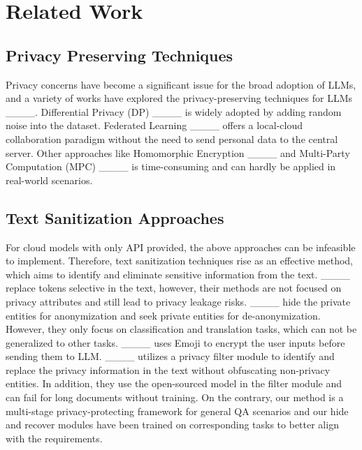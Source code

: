 \section{Related Work}
\label{sec:related work}
\subsection{Privacy Preserving Techniques}
Privacy concerns have become a significant issue for the broad adoption of LLMs, and a variety of works have explored the privacy-preserving techniques for LLMs ____.
Differential Privacy (DP) ____ is widely adopted by adding random noise into the dataset.
Federated Learning ____ offers a local-cloud collaboration paradigm without the need to send personal data to the central server.
Other approaches like Homomorphic Encryption ____ and Multi-Party Computation (MPC) ____ is time-consuming and can hardly be applied in real-world scenarios.

\subsection{Text Sanitization Approaches}

For cloud models with only API provided, the above approaches can be infeasible to implement.
Therefore, text sanitization techniques rise as an effective method, which aims to identify and eliminate sensitive information from the text.
____ replace tokens selective in the text, however, their methods are not focused on privacy attributes and still lead to privacy leakage risks.
____ hide the private entities for anonymization and seek private entities for de-anonymization. However, they only focus on classification and translation tasks, which can not be generalized to other tasks.
____ uses Emoji to encrypt the user
inputs before sending them to LLM.
____ utilizes a privacy filter module to identify and replace the privacy information in the text without obfuscating non-privacy entities. In addition, they use the open-sourced model in the filter module and can fail for long documents without training.
On the contrary, our method is a multi-stage privacy-protecting framework for general QA scenarios and our hide and recover modules have been trained on corresponding tasks to better align with the requirements.